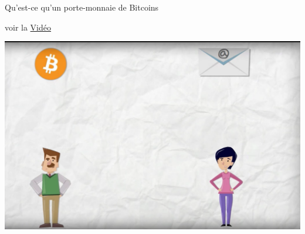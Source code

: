 \documentclass[presentation]{beamer}
\begin{document}
\begin{frame}[label={sec:org5c05b09}]{Qu'est-ce qu'un porte-monnaie de Bitcoins}
\begin{block}{voir la  \href{https://www.youtube.com/watch?v=oTfOfqmb5tU\&feature=emb\_err\_woyt}{Vidéo}}
\begin{center}
\includegraphics[width=.9\textwidth]{./Pictures/Cours2/wallet.png}
\end{center}
\end{block}
\end{frame}
\end{document}
